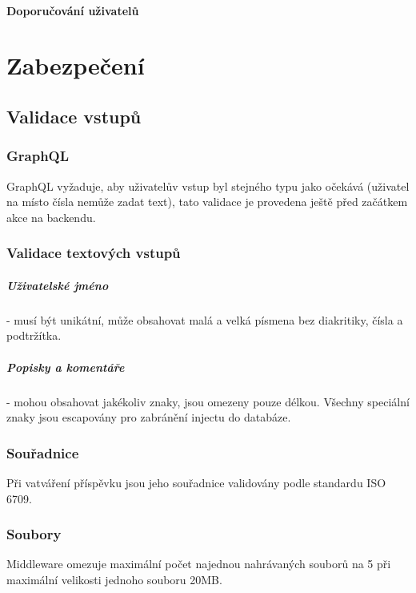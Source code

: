 \documentclass[12pt, a4paper,
 twoside,        %
 openright
]{report}
\begin{document}
        \subsubsection{Doporučování uživatelů}

\chapter{Zabezpečení}
\section{Validace vstupů}
\subsection{GraphQL}
GraphQL vyžaduje, aby uživatelův vstup byl stejného typu jako očekává (uživatel na místo čísla nemůže zadat text), tato validace je provedena ještě před začátkem akce na backendu. 
\subsection{Validace textových vstupů}
\paragraph{Uživatelské jméno} - musí být unikátní, může obsahovat malá a velká písmena bez diakritiky, čísla a podtržítka.
\paragraph{Popisky a komentáře} - mohou obsahovat jakékoliv znaky, jsou omezeny pouze délkou. Všechny speciální znaky jsou escapovány pro zabránění injectu do databáze.
\subsection{Souřadnice} Při vatváření příspěvku jsou jeho souřadnice validovány podle standardu ISO 6709.
\subsection{Soubory} Middleware omezuje maximální počet najednou nahrávaných souborů na 5 při maximální velikosti jednoho souboru 20MB.
\end{document}
